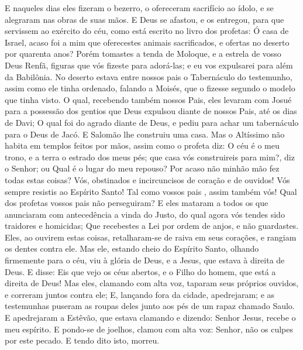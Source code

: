 {  E naqueles dias eles fizeram o bezerro, o ofereceram sacrifício ao ídolo, e se alegraram nas obras de suas
{} mãos.
  E Deus se afastou{},  e os entregou, para que servissem ao exército do céu, como está escrito no livro dos profetas: Ó casa de Israel, acaso foi a mim que oferecestes animais sacrificados, e ofertas no deserto por quarenta anos?
  Porém tomastes
{} a tenda de Moloque, e a estrela de vosso Deus Renfã, figuras que vós fizeste para adorá-las; e eu
{} vos expulsarei para além da Babilônia.
  No deserto estava entre nossos pais o Tabernáculo do testemunho, assim como ele tinha ordenado, falando a Moisés, que o fizesse segundo o modelo que tinha visto.
  O qual, recebendo
{} também nossos Pais, eles levaram com Josué para a possessão dos gentios que Deus expulsou diante de nossos Pais, até os dias de Davi;
  O qual foi do agrado diante de Deus, e pediu para achar um tabernáculo para o Deus de Jacó.
  E Salomão lhe construiu uma casa.
  Mas o Altíssimo não habita em templos feitos por mãos, assim como o profeta diz:
  O céu é o meu trono, e a terra
{} o estrado dos meus pés; que casa vós construireis para mim?, diz o Senhor; ou Qual é o lugar do meu repouso?
  Por acaso não
{} minhão mão
{} fez todas estas coisas?
  Vós, obstinados e incircuncisos de coração e de ouvidos! Vós sempre resistis ao Espírito Santo! Tal como vossos pais
{},  assim também
{} vós!
  Qual dos profetas vossos pais não perseguiram? E eles mataram a todos os que anunciaram com antecedência a vinda do Justo, do qual agora vós tendes sido traidores e homicidas;
  Que recebestes a Lei por ordem de anjos, e não
{} guardastes.
  Eles, ao ouvirem estas coisas, retalharam-se de raiva em seus corações, e rangiam os dentes contra ele.
  Mas ele, estando cheio do Espírito Santo, olhando firmemente para o céu, viu à glória de Deus, e a Jesus, que estava à direita de Deus.
  E disse: Eis que vejo os céus abertos, e o Filho do homem, que está a direita de Deus!
  Mas eles, clamando com alta voz, taparam seus próprios ouvidos, e correram juntos contra ele;
  E, lançando
{} fora da cidade,
{} apedrejaram; e as testemunhas puseram as roupas deles junto aos pés de um rapaz chamado Saulo.
  E apedrejaram a Estêvão, que estava clamando e dizendo: Senhor Jesus, recebe o meu espírito.
  E pondo-se de joelhos, clamou com alta voz: Senhor, não os culpes por este pecado. E tendo dito isto, morreu.
\par }

